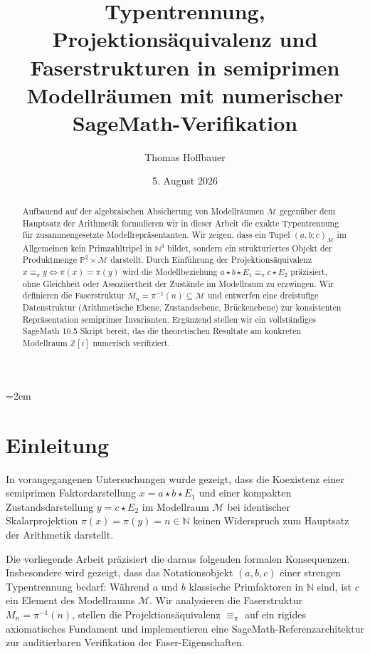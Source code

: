 \documentclass[11pt,a4paper,reqno]{amsart}
\title[Typentrennung, Faserstruktur und SageMath-Verifikation]{Typentrennung, Projektionsäquivalenz und Faserstrukturen in semiprimen Modellräumen mit numerischer SageMath-Verifikation}
\author{Thomas Hoffbauer}
\date{5. August 2026}
\theoremstyle{definition}
\theoremstyle{remark}
\newcommand{\M}{\mathcal{M}}
\newcommand{\N}{\mathbb{N}}
\newcommand{\Pset}{\mathbb{P}}
\newcommand{\Z}{\mathbb{Z}}
\begin{document}
\raggedbottom
\emergencystretch=2em

\begin{abstract}
Aufbauend auf der algebraischen Absicherung von Modellräumen $\M$ gegenüber dem Hauptsatz der Arithmetik formulieren wir in dieser Arbeit die exakte Typentrennung für zusammengesetzte Modellrepräsentanten. Wir zeigen, dass ein Tupel $(a,b;c)_\M$ im Allgemeinen kein Primzahltripel in $\N^3$ bildet, sondern ein strukturiertes Objekt der Produktmenge $\Pset^2 \times \M$ darstellt. Durch Einführung der Projektionsäquivalenz $x \equiv_\pi y \iff \pi(x) = \pi(y)$ wird die Modellbeziehung $a \star b \star E_1 \equiv_\pi c \star E_2$ präzisiert, ohne Gleichheit oder Assoziiertheit der Zustände im Modellraum zu erzwingen. Wir definieren die Faserstruktur $M_n = \pi^{-1}(n) \subseteq \M$ und entwerfen eine dreistufige Datenstruktur (Arithmetische Ebene, Zustandsebene, Brückenebene) zur konsistenten Repräsentation semiprimer Invarianten. Ergänzend stellen wir ein vollständiges SageMath 10.5 Skript bereit, das die theoretischen Resultate am konkreten Modellraum $\Z[i]$ numerisch verifiziert.
\end{abstract}

\maketitle

\section{Einleitung}

In vorangegangenen Untersuchungen \cite{Hoffbauer2026} wurde gezeigt, dass die Koexistenz einer semiprimen Faktordarstellung $x = a \star b \star E_1$ und einer kompakten Zustandsdarstellung $y = c \star E_2$ im Modellraum $\M$ bei identischer Skalarprojektion $\pi(x) = \pi(y) = n \in \N$ keinen Widerspruch zum Hauptsatz der Arithmetik darstellt.

Die vorliegende Arbeit präzisiert die daraus folgenden formalen Konsequenzen. Insbesondere wird gezeigt, dass das Notationsobjekt $(a,b,c)$ einer strengen Typentrennung bedarf: Während $a$ und $b$ klassische Primfaktoren in $\N$ sind, ist $c$ ein Element des Modellraums $\M$. Wir analysieren die Faserstruktur $M_n = \pi^{-1}(n)$, stellen die Projektionsäquivalenz $\equiv_\pi$ auf ein rigides axiomatisches Fundament und implementieren eine SageMath-Referenzarchitektur zur auditierbaren Verifikation der Faser-Eigenschaften.
\end{document}
